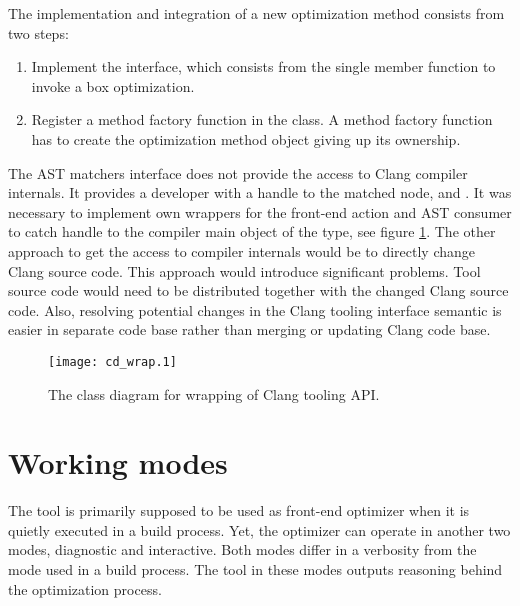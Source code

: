 The implementation and integration of a new optimization method consists from two steps:
\begin{enumerate}
\item Implement the  interface, which consists from the single member function to invoke a box optimization.
\item Register a method factory function in the  class. A method factory function has to create the optimization method object giving up its ownership.
\end{enumerate}

The AST matchers interface does not provide the access to Clang compiler internals. It provides a developer with a handle to the matched node,  and . It was necessary to implement own wrappers for the front-end action and AST consumer to catch handle to the compiler main object of the  type, see figure \ref{class-interface}. The other approach to get the access to compiler internals would be to directly change Clang source code. This approach would introduce significant problems. Tool source code would need to be distributed together with the changed Clang source code. Also, resolving potential changes in the Clang tooling interface semantic is easier in separate code base rather than merging or updating Clang code base.

\begin{figure}[h!]
\caption{The class diagram for wrapping of Clang tooling API.}
\label{class-interface}
\vspace{0.5cm}
\centering
\texttt{[image: cd\_wrap.1]}
\end{figure}

\section{Working modes}
The tool is primarily supposed to be used as front-end optimizer when it is quietly executed in a build process. Yet, the optimizer can operate in another two modes, diagnostic and interactive. Both modes differ in a verbosity from the mode used in a build process. The tool in these modes outputs reasoning behind the optimization process.

